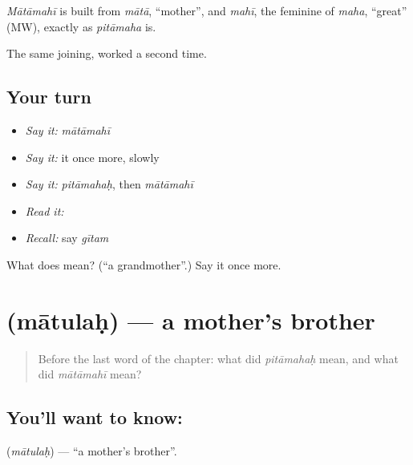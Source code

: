 \begin{cousinweb}
\emph{Mātāmahī} is built from \emph{mātā}, \textquotedblleft{}mother\textquotedblright{}, and \emph{mahī}, the feminine of \emph{maha}, \textquotedblleft{}great\textquotedblright{} (MW), exactly as \emph{pitāmaha} is.
\end{cousinweb}

\begin{grammarlens}[title={What you've built}]
The same joining, worked a second time.
\end{grammarlens}

\subsection*{Your turn}
\begin{itemize}
\raggedright
  \item \emph{Say it:} \emph{mātāmahī}
  \item \emph{Say it:} it once more, slowly
  \item \emph{Say it:} \emph{pitāmahaḥ}, then \emph{mātāmahī}
  \item \emph{Read it:} \textbf{}
  \item \emph{Recall:} say \emph{gītam}
\end{itemize}

\begin{tcolorbox}[breakable,colback=teal!4,colframe=teal!35!black,title={Before you move on}]
What does  mean? (\textquotedblleft{}a grandmother\textquotedblright{}.) Say it once more.
\end{tcolorbox}
\section[\texorpdfstring{\sk{मातुलः} (mātulaḥ)}{मातुलः (mātulaḥ)}]{ (mātulaḥ) — a mother's brother}

\label{lesson:SA-C51-uncle}



\begin{quote}
Before the last word of the chapter: what did \emph{pitāmahaḥ} mean, and what did \emph{mātāmahī} mean?
\end{quote}

\subsection*{You'll want to know: }
\textbf{} (\emph{mātulaḥ}) — \textquotedblleft{}a mother's brother\textquotedblright{}.

